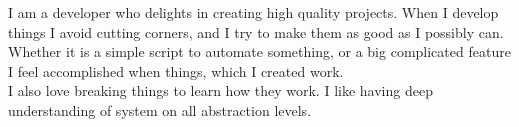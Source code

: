 \documentclass[9pt]{developercv} %
\begin{document}
\vspace{0.5cm}


\begin{minipage}[t]{0.4\textwidth} %
	\vspace{-\baselineskip} %

	I am a developer who delights in creating high quality projects.
	When I develop things I avoid cutting corners, and I try to make them as good as I possibly can. \\
	Whether it is a simple script to automate something, or a big complicated feature
	I feel accomplished when things, which I created work.\\
	I also love breaking things to learn how they work.
	I like having deep understanding of system on all abstraction levels.


\end{minipage}
\hfill %
\begin{minipage}[t]{0.5\textwidth} %
	\vspace{-\baselineskip} %
	\begin{barchart}{5.5}
	\end{barchart}
\end{minipage}

\begin{center}
\end{center}


\end{document}
